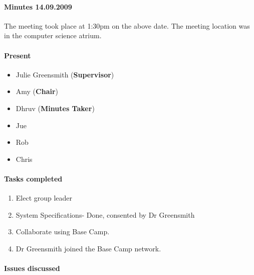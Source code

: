 \paragraph{Minutes 14.09.2009}  
The meeting took place at 1:30pm on the above date. The meeting location was in the computer science atrium. 

\paragraph{Present}

\begin{itemize}
	\item Julie Greensmith (\textbf{Supervisor})
	\item Amy (\textbf{Chair})
	\item Dhruv (\textbf{Minutes Taker})
	\item Jue
	\item Rob
	\item Chris 
\end{itemize}

\paragraph{Tasks completed}

\begin{enumerate}
	\item Elect group leader
	\item System Specifications- Done, consented by Dr Greensmith
	\item Collaborate using Base Camp.
	\item Dr Greensmith joined the Base Camp network.
\end{enumerate}


\paragraph{Issues discussed}

